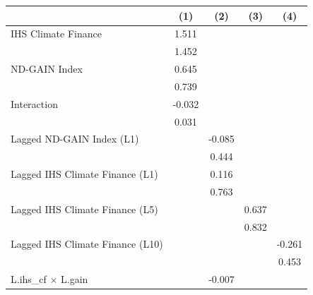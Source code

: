 {
\def\sym#1{\ifmmode^{#1}\else\(^{#1}\)\fi}
\begin{tabular}{l*{4}{c}}
\toprule
                    &\multicolumn{1}{c}{(1)}         &\multicolumn{1}{c}{(2)}         &\multicolumn{1}{c}{(3)}         &\multicolumn{1}{c}{(4)}         \\
\midrule
IHS Climate Finance &       1.511         &                     &                     &                     \\
                    &       1.452         &                     &                     &                     \\
ND-GAIN Index       &       0.645         &                     &                     &                     \\
                    &       0.739         &                     &                     &                     \\
Interaction         &      -0.032         &                     &                     &                     \\
                    &       0.031         &                     &                     &                     \\
Lagged ND-GAIN Index (L1)&                     &      -0.085         &                     &                     \\
                    &                     &       0.444         &                     &                     \\
Lagged IHS Climate Finance (L1)&                     &       0.116         &                     &                     \\
                    &                     &       0.763         &                     &                     \\
Lagged IHS Climate Finance (L5)&                     &                     &       0.637         &                     \\
                    &                     &                     &       0.832         &                     \\
Lagged IHS Climate Finance (L10)&                     &                     &                     &      -0.261         \\
                    &                     &                     &                     &       0.453         \\
L.ihs\_cf $\times$ L.gain&                     &      -0.007         &                     &                     \\

\end{tabular}}
